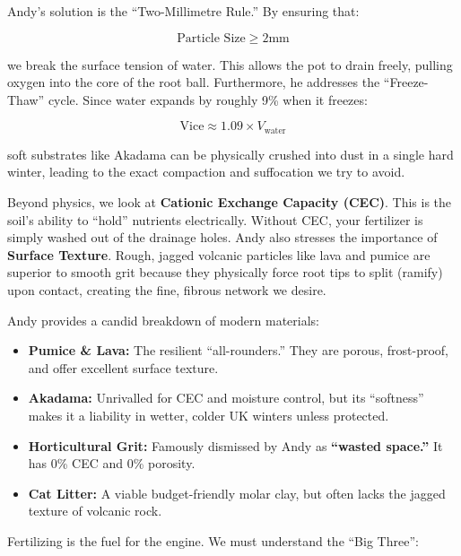 Andy's solution is the ``Two-Millimetre Rule.'' By ensuring that:

\vspace*{-0.751em}
$$ \text{Particle Size} \geq 2 \text{mm} $$

\noindent
we break the surface tension of water.
This allows the pot to drain freely, pulling oxygen into the core of the root ball.
Furthermore, he addresses the ``Freeze-Thaw'' cycle.
Since water expands by roughly 9\% when it freezes:

\vspace*{-0.75em}
$$ \text{Vice} \approx 1.09 \times V_\text{water} $$

\noindent
soft substrates like Akadama can be physically crushed into dust in a single hard winter, leading to the exact compaction and suffocation we try to avoid.

\noindent
Beyond physics, we look at \textbf{Cationic Exchange Capacity (CEC)}.
This is the soil's ability to ``hold'' nutrients electrically.
Without CEC, your fertilizer is simply washed out of the drainage holes.
Andy also stresses the importance of \textbf{Surface Texture}.
Rough, jagged volcanic particles like lava and pumice are superior to smooth grit because they physically force root tips to split (ramify) upon contact, creating the fine, fibrous network we desire.

\noindent
Andy provides a candid breakdown of modern materials:

\begin{itemize}
    \item \textbf{Pumice \& Lava:} The resilient ``all\--rounders.''
    They are porous, frost-proof, and offer excellent surface texture.

    \item \textbf{Akadama:} Unrivalled for CEC and moisture control, but its ``softness'' makes it a liability in wetter, colder UK winters unless protected.

    \item \textbf{Horticultural Grit:} Famously dismissed by Andy as \textbf{``wasted space.''}
    It has 0\% CEC and 0\% porosity.

    \item \textbf{Cat Litter:} A viable budget\--friendly molar clay, but often lacks the jagged texture of volcanic rock.
\end{itemize}

\noindent
Fertilizing is the fuel for the engine.
We must understand the ``Big Three'':

